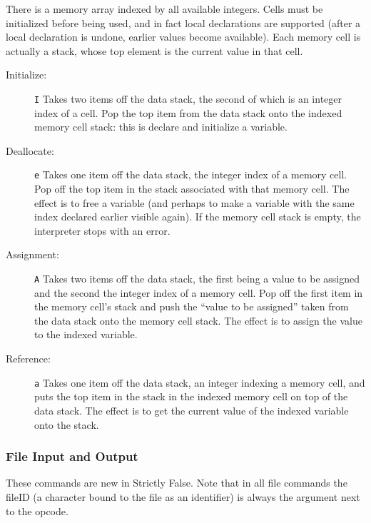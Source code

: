 \documentclass[12pt]{article}
\begin{document}
There is a memory array indexed by all available integers.  Cells must
be initialized before being used, and in fact local declarations
are supported (after a local declaration is undone, earlier values
become available).  Each memory cell is actually a stack, whose
top element is the current value in that cell.
\begin{description}
\item[Initialize:]  {\tt I} Takes two items off the data stack, the second of which
is an integer index of a cell.  Pop the top item from the data stack
onto the indexed memory cell stack:  this is declare and initialize a variable.

\item[Deallocate:] {\tt e} Takes one item off the data stack, the integer
index of a memory cell.  Pop off the top item in the stack associated
with that memory cell.  The effect is to free a variable (and perhaps
to make a variable with the same index declared earlier visible
again). If the memory cell stack is empty, the interpreter stops with
an error.

\item[Assignment:] {\tt A} Takes two items off the data stack, the first
being a value to be assigned and the second the integer index of a
memory cell.  Pop off the first item in the memory cell's stack and
push the ``value to be assigned'' taken from the data stack onto the
memory cell stack.  The effect is to assign the value to the indexed
variable.

\item[Reference:] {\tt a} Takes one item off the data stack, an
integer indexing a memory cell, and puts the top item in the stack in
the indexed memory cell on top of the data stack.  The effect is to
get the current value of the indexed variable onto the stack.
\end{description}
\subsubsection{File Input and Output}

These commands are new in Strictly False.  Note that in all file commands
the fileID (a character bound to the file as an identifier) is always the
argument next to the opcode.
\end{document}
